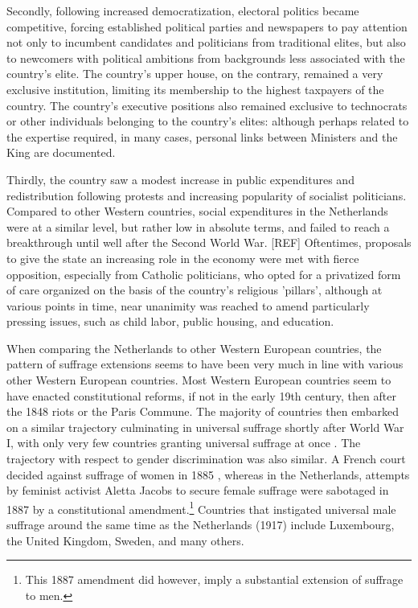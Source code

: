     Secondly, following increased democratization, electoral politics became competitive, forcing established political parties and newspapers to pay attention not only to incumbent candidates and politicians from traditional elites, but also to newcomers with political ambitions from backgrounds less associated with the country's elite. The country's upper house, on the contrary, remained a very exclusive institution, limiting its membership to the highest taxpayers of the country. The country's executive positions also remained exclusive to technocrats or other individuals belonging to the country's elites: although perhaps related to the expertise required, in many cases, personal links between Ministers and the King are documented. \autocite{secker1991ministers}

    Thirdly, the country saw a modest increase in public expenditures and redistribution following protests and increasing popularity of socialist politicians. Compared to other Western countries, social expenditures in the Netherlands were at a similar level, but rather low in absolute terms, and failed to reach a breakthrough until well after the Second World War. [REF] Oftentimes, proposals to give the state an increasing role in the economy were met with fierce opposition, especially from Catholic politicians, who opted for a privatized form of care organized on the basis of the country's religious 'pillars', although at various points in time, near unanimity was reached to amend particularly pressing issues, such as child labor, public housing, and education. \autocite{van2013eerste}

    When comparing the Netherlands to other Western European countries,  the pattern of suffrage extensions seems to have been very much in line with various other Western European countries. Most Western European countries seem to have enacted constitutional reforms, if not in the early 19th century, then after the 1848 riots or the Paris Commune. The majority of countries then embarked on a similar trajectory culminating in universal suffrage shortly after World War I, with only very few countries granting universal suffrage at once \autocite{caramani2017elections}. The trajectory with respect to gender discrimination was also similar. A French court decided against suffrage of women in 1885 \autocite{przeworski2009conquered}, whereas in the Netherlands, attempts by feminist activist Aletta Jacobs to secure female suffrage were sabotaged in 1887 by a constitutional amendment.\footnote{This 1887 amendment did however, imply a substantial extension of suffrage to men.} Countries that instigated universal male suffrage around the same time as the Netherlands (1917) include Luxembourg, the United Kingdom, Sweden, and many others. \autocite{caramani2017elections}

